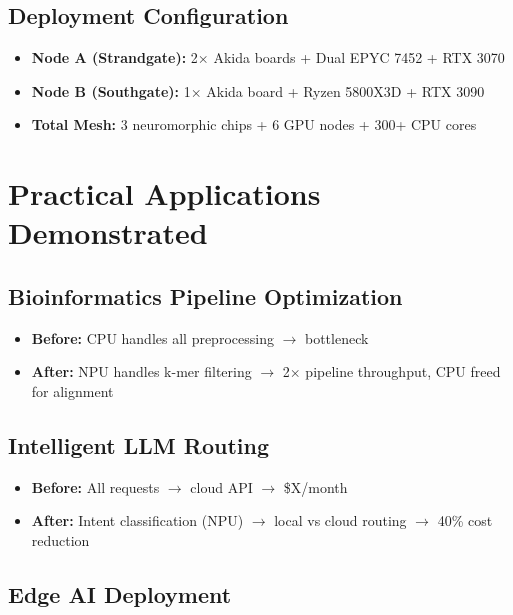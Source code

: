 \documentclass[11pt,a4paper]{article}
\begin{document}
\subsection{Deployment Configuration}

\begin{itemize}[leftmargin=*]
    \item \textbf{Node A (Strandgate):} 2$\times$ Akida boards + Dual EPYC 7452 + RTX 3070
    \item \textbf{Node B (Southgate):} 1$\times$ Akida board + Ryzen 5800X3D + RTX 3090
    \item \textbf{Total Mesh:} 3 neuromorphic chips + 6 GPU nodes + 300+ CPU cores
\end{itemize}

\section{Practical Applications Demonstrated}

\subsection{Bioinformatics Pipeline Optimization}

\begin{itemize}[leftmargin=*]
    \item \textbf{Before:} CPU handles all preprocessing $\rightarrow$ bottleneck
    \item \textbf{After:} NPU handles k-mer filtering $\rightarrow$ 2$\times$ pipeline throughput, CPU freed for alignment
\end{itemize}

\subsection{Intelligent LLM Routing}

\begin{itemize}[leftmargin=*]
    \item \textbf{Before:} All requests $\rightarrow$ cloud API $\rightarrow$ \$X/month
    \item \textbf{After:} Intent classification (NPU) $\rightarrow$ local vs cloud routing $\rightarrow$ 40\% cost reduction
\end{itemize}

\subsection{Edge AI Deployment}
\end{document}
